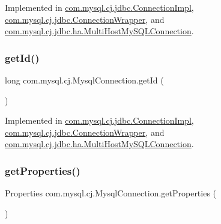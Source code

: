 Implemented in \mbox{\hyperlink{classcom_1_1mysql_1_1cj_1_1jdbc_1_1_connection_impl_a9333bafa5720993c7b74f73e07710388}{com.\+mysql.\+cj.\+jdbc.\+Connection\+Impl}}, \mbox{\hyperlink{classcom_1_1mysql_1_1cj_1_1jdbc_1_1_connection_wrapper_a3f7f70fcff77c01e2e8d4bf12802d0e0}{com.\+mysql.\+cj.\+jdbc.\+Connection\+Wrapper}}, and \mbox{\hyperlink{classcom_1_1mysql_1_1cj_1_1jdbc_1_1ha_1_1_multi_host_my_s_q_l_connection_a137370a98bed09d640fa15f2b8832e8b}{com.\+mysql.\+cj.\+jdbc.\+ha.\+Multi\+Host\+My\+S\+Q\+L\+Connection}}.

\mbox{\label{interfacecom_1_1mysql_1_1cj_1_1_mysql_connection_aba5831e0b7016bc8b3fffa0c2e728fee}} 
\subsubsection{\texorpdfstring{get\+Id()}{getId()}}
{\footnotesize\ttfamily long com.\+mysql.\+cj.\+Mysql\+Connection.\+get\+Id (\begin{DoxyParamCaption}{ }\end{DoxyParamCaption})}



Implemented in \mbox{\hyperlink{classcom_1_1mysql_1_1cj_1_1jdbc_1_1_connection_impl_ae835f7c80a3c9705b622a244ba07e7e3}{com.\+mysql.\+cj.\+jdbc.\+Connection\+Impl}}, \mbox{\hyperlink{classcom_1_1mysql_1_1cj_1_1jdbc_1_1_connection_wrapper_acedea8a5e36d279cb32705ee2a1b4d54}{com.\+mysql.\+cj.\+jdbc.\+Connection\+Wrapper}}, and \mbox{\hyperlink{classcom_1_1mysql_1_1cj_1_1jdbc_1_1ha_1_1_multi_host_my_s_q_l_connection_a1c1baa5c3292115f16511d6f99d69154}{com.\+mysql.\+cj.\+jdbc.\+ha.\+Multi\+Host\+My\+S\+Q\+L\+Connection}}.

\mbox{\label{interfacecom_1_1mysql_1_1cj_1_1_mysql_connection_a1fde8714cc1e2176748fd4f35f0df0d1}} 
\subsubsection{\texorpdfstring{get\+Properties()}{getProperties()}}
{\footnotesize\ttfamily Properties com.\+mysql.\+cj.\+Mysql\+Connection.\+get\+Properties (\begin{DoxyParamCaption}{ }\end{DoxyParamCaption})}

